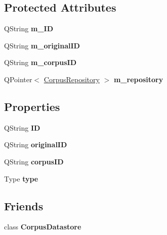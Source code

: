 \subsection*{Protected Attributes}
\begin{DoxyCompactItemize}
\item 
\mbox{\label{class_corpus_object_a7c764f5c4ca06ae1910b90aaca70945a}} 
Q\+String {\bfseries m\+\_\+\+ID}
\item 
\mbox{\label{class_corpus_object_a31e6a6a19903610a4187aa0600dc0041}} 
Q\+String {\bfseries m\+\_\+original\+ID}
\item 
\mbox{\label{class_corpus_object_a00bfdb906e43b45e3d09f285d50d9007}} 
Q\+String {\bfseries m\+\_\+corpus\+ID}
\item 
\mbox{\label{class_corpus_object_a5828ef6aeb1ae8277621786f22614c87}} 
Q\+Pointer$<$ \hyperlink{class_corpus_repository}{Corpus\+Repository} $>$ {\bfseries m\+\_\+repository}
\end{DoxyCompactItemize}
\subsection*{Properties}
\begin{DoxyCompactItemize}
\item 
\mbox{\label{class_corpus_object_a2e87f6afeb982f6b9ab31eb1f7423382}} 
Q\+String {\bfseries ID}
\item 
\mbox{\label{class_corpus_object_aa54db2f97f4e244f229c2afbd26f8e34}} 
Q\+String {\bfseries original\+ID}
\item 
\mbox{\label{class_corpus_object_a580f7c90c3839b4b10bbac02a8b5b641}} 
Q\+String {\bfseries corpus\+ID}
\item 
\mbox{\label{class_corpus_object_a1eb66ea1ca76fcb8500ecf9b67959c66}} 
Type {\bfseries type}
\end{DoxyCompactItemize}
\subsection*{Friends}
\begin{DoxyCompactItemize}
\item 
\mbox{\label{class_corpus_object_a4fb3bed7506f0eb1a6ce3107c88f6561}} 
class {\bfseries Corpus\+Datastore}
\end{DoxyCompactItemize}


